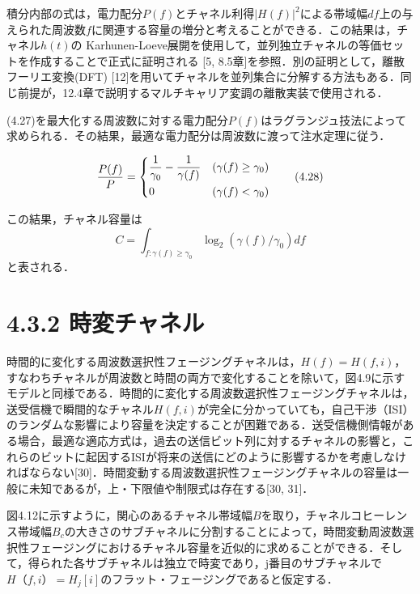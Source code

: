 \documentclass[dvipdfmx]{jsarticle}
\begin{document}
\noindent
積分内部の式は，電力配分$P(f)$とチャネル利得$|H(f)|^2$による帯域幅$df$上の与えられた周波数$f$に関連する容量の増分と考えることができる．この結果は，チャネル$h(t)$の Karhunen-Loeve展開を使用して，並列独立チャネルの等価セットを作成することで正式に証明される [5, 8.5章]を参照．別の証明として，離散フーリエ変換(DFT) [12]を用いてチャネルを並列集合に分解する方法もある．同じ前提が，12.4章で説明するマルチキャリア変調の離散実装で使用される．

(4.27)を最大化する周波数に対する電力配分$P(f)$はラグランジュ技法によって求められる．その結果，最適な電力配分は周波数に渡って注水定理に従う．

\begin{equation}
\frac{P(f)}{P} =
\begin{dcases}
\frac{1}{\gamma_0} - \frac{1}{\gamma (f)} & (\gamma (f) \geq \gamma_0) \\
0 & (\gamma (f) < \gamma_0)
\end{dcases}
\tag{4.28}
\end{equation}

\noindent
この結果，チャネル容量は
\begin{equation}\label{}
C = \int_{f:\gamma (f) \geq \gamma_0} \log_2 (\gamma(f) / \gamma_0) df
\tag{4.29}
\end{equation}
と表される．

\section*{4.3.2 時変チャネル}

\noindent
時間的に変化する周波数選択性フェージングチャネルは，$H(f) = H(f, i)$，すなわちチャネルが周波数と時間の両方で変化することを除いて，図4.9に示すモデルと同様である．時間的に変化する周波数選択性フェージングチャネルは，送受信機で瞬間的なチャネル$H(f, i)$が完全に分かっていても，自己干渉（ISI）のランダムな影響により容量を決定することが困難である．送受信機側情報がある場合，最適な適応方式は，過去の送信ビット列に対するチャネルの影響と，これらのビットに起因するISIが将来の送信にどのように影響するかを考慮しなければならない[30]．時間変動する周波数選択性フェージングチャネルの容量は一般に未知であるが，上・下限値や制限式は存在する[30, 31]．

図4.12に示すように，関心のあるチャネル帯域幅$B$を取り，チャネルコヒーレンス帯域幅$B_c$の大きさのサブチャネルに分割することによって，時間変動周波数選択性フェージングにおけるチャネル容量を近似的に求めることができる．そして，得られた各サブチャネルは独立で時変であり，j番目のサブチャネルで$H（f, i）= H_j[i]$のフラット・フェージングであると仮定する．
\end{document}

